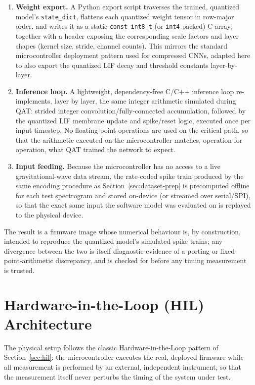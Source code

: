 \begin{enumerate}
    \item \textbf{Weight export.} A Python export script traverses the trained, quantized model's \texttt{state\_dict}, flattens each quantized weight tensor in row-major order, and writes it as a static \texttt{const int8\_t} (or \texttt{int4}-packed) C array, together with a header exposing the corresponding scale factors and layer shapes (kernel size, stride, channel counts). This mirrors the standard microcontroller deployment pattern used for compressed CNNs, adapted here to also export the quantized LIF decay and threshold constants layer-by-layer.
    \item \textbf{Inference loop.} A lightweight, dependency-free C/C++ inference loop re-implements, layer by layer, the same integer arithmetic simulated during QAT: strided integer convolution/fully-connected accumulation, followed by the quantized LIF membrane update and spike/reset logic, executed once per input timestep. No floating-point operations are used on the critical path, so that the arithmetic executed on the microcontroller matches, operation for operation, what QAT trained the network to expect.
    \item \textbf{Input feeding.} Because the microcontroller has no access to a live gravitational-wave data stream, the rate-coded spike train produced by the same encoding procedure as Section~\ref{sec:dataset-prep} is precomputed offline for each test spectrogram and stored on-device (or streamed over serial/SPI), so that the exact same input the software model was evaluated on is replayed to the physical device.
\end{enumerate}

The result is a firmware image whose numerical behaviour is, by construction, intended to reproduce the quantized model's simulated spike trains; any divergence between the two is itself diagnostic evidence of a porting or fixed-point-arithmetic discrepancy, and is checked for before any timing measurement is trusted.

\section{Hardware-in-the-Loop (HIL) Architecture}
\label{sec:hil-architecture}

The physical setup follows the classic Hardware-in-the-Loop pattern of Section~\ref{sec:hil}: the microcontroller executes the real, deployed firmware while all measurement is performed by an external, independent instrument, so that the measurement itself never perturbs the timing of the system under test.

